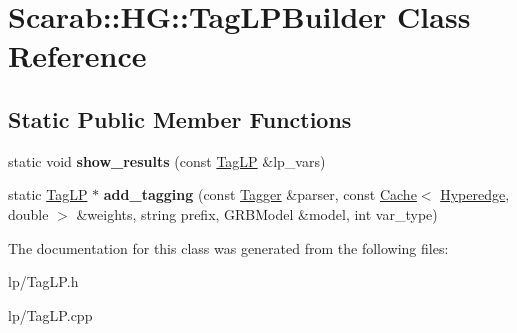 \hypertarget{class_scarab_1_1_h_g_1_1_tag_l_p_builder}{
\section{Scarab::HG::TagLPBuilder Class Reference}
\label{class_scarab_1_1_h_g_1_1_tag_l_p_builder}
}
\subsection*{Static Public Member Functions}
\begin{DoxyCompactItemize}
\item 
\hypertarget{class_scarab_1_1_h_g_1_1_tag_l_p_builder_aa4990c224df5a1c82220a655ee51bd73}{
static void {\bfseries show\_\-results} (const \hyperlink{struct_scarab_1_1_h_g_1_1_tag_l_p}{TagLP} \&lp\_\-vars)}
\label{class_scarab_1_1_h_g_1_1_tag_l_p_builder_aa4990c224df5a1c82220a655ee51bd73}

\item 
\hypertarget{class_scarab_1_1_h_g_1_1_tag_l_p_builder_a9c0f3ee542cbbed34945b80932272cea}{
static \hyperlink{struct_scarab_1_1_h_g_1_1_tag_l_p}{TagLP} $\ast$ {\bfseries add\_\-tagging} (const \hyperlink{class_tagger}{Tagger} \&parser, const \hyperlink{class_cache}{Cache}$<$ \hyperlink{class_scarab_1_1_h_g_1_1_hyperedge}{Hyperedge}, double $>$ \&weights, string prefix, GRBModel \&model, int var\_\-type)}
\label{class_scarab_1_1_h_g_1_1_tag_l_p_builder_a9c0f3ee542cbbed34945b80932272cea}

\end{DoxyCompactItemize}


The documentation for this class was generated from the following files:\begin{DoxyCompactItemize}
\item 
lp/TagLP.h\item 
lp/TagLP.cpp\end{DoxyCompactItemize}
